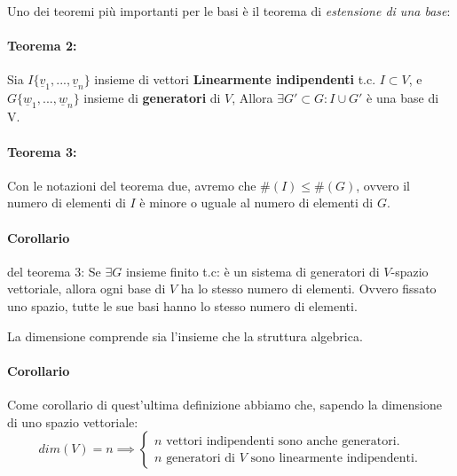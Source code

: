 
Uno dei teoremi più importanti per le basi è il teorema di \emph{estensione di una base}:
\paragraph{Teorema 2:}
Sia $I\{\underline{v}_1,...,\underline{v}_n\}$ insieme di vettori \textbf{Linearmente indipendenti} t.c. $I\subset V$,
e $G\{\underline{w}_1,...,\underline{w}_n\}$ insieme di \textbf{generatori} di $V$,
Allora $\exists G' \subset G : I \cup G'$ è una base di V.

\paragraph{Teorema 3:} Con le notazioni del teorema due, avremo che $\#(I) \leq \#(G)$, ovvero il numero di elementi di $I$ è minore o uguale al numero di elementi di $G$.

\paragraph{Corollario} del teorema 3:
Se $\exists G$ insieme finito t.c: è un sistema di generatori di $V$-spazio vettoriale, allora ogni base di $V$ ha lo stesso numero di elementi.
Ovvero fissato uno spazio, tutte le sue basi hanno lo stesso numero di elementi.

La dimensione comprende sia l'insieme che la struttura algebrica.

\paragraph{Corollario} Come corollario di quest'ultima definizione abbiamo che, sapendo la dimensione di
uno spazio vettoriale:
$$dim(V)=n\implies
\begin{cases}
    n \text{ vettori indipendenti sono anche generatori.} \\
    n \text{ generatori di $V$ sono linearmente indipendenti.}
\end{cases}
$$
 